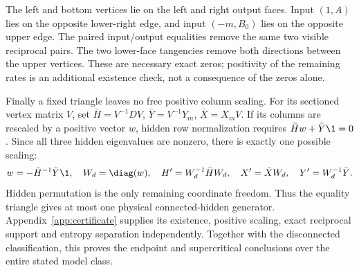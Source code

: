 The left and bottom vertices lie on the left and right output faces.
Input $(1,A)$ lies on the opposite lower-right edge, and input
$(-m,B_0)$ lies on the opposite upper edge. The paired input/output
equalities remove the same two visible reciprocal pairs. The two
lower-face tangencies remove both directions between the upper
vertices. These are necessary exact zeros; positivity of the remaining
rates is an additional existence check, not a consequence of the zeros
alone.

Finally a fixed triangle leaves no free positive column scaling. For
its sectioned vertex matrix $V$, set
$\bar H=V^{-1}DV$, $\bar Y=V^{-1}Y_m$, $\bar X=X_mV$.
If its columns are rescaled by a positive vector $w$, hidden row
normalization requires $\bar H w+\bar Y\1=0$. Since all three hidden
eigenvalues are nonzero, there is exactly one possible scaling:
\begin{equation}
 w=-\bar H^{-1}\bar Y\1,\quad W_d=\diag(w),\quad
 H'=W_d^{-1}\bar HW_d,\quad X'=\bar XW_d,\quad
 Y'=W_d^{-1}\bar Y.\label{eq:normalize}
\end{equation}
Hidden permutation is the only remaining coordinate freedom. Thus the
equality triangle gives at most one physical connected-hidden generator.
Appendix~\ref{app:certificate} supplies its existence, positive scaling,
exact reciprocal support and entropy separation independently. Together
with the disconnected classification, this proves the endpoint and
supercritical conclusions over the entire stated model class.
